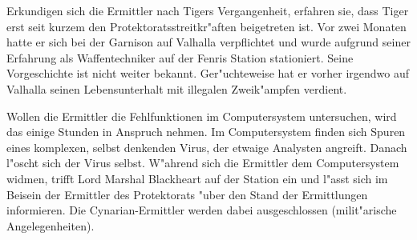 Erkundigen sich die Ermittler nach Tigers Vergangenheit, erfahren sie, dass Tiger erst seit kurzem den Protektoratsstreitkr"aften beigetreten ist. Vor zwei Monaten hatte er sich bei der Garnison auf Valhalla verpflichtet und wurde aufgrund seiner Erfahrung als Waffentechniker auf der Fenris Station stationiert. Seine Vorgeschichte ist nicht weiter bekannt. Ger"uchteweise hat er vorher irgendwo auf Valhalla seinen Lebensunterhalt mit illegalen Zweik"ampfen verdient. 

Wollen die Ermittler die Fehlfunktionen im Computersystem untersuchen, wird das einige Stunden in Anspruch nehmen. Im Computersystem finden sich Spuren eines komplexen, selbst denkenden Virus, der etwaige Analysten angreift. Danach l"oscht sich der Virus selbst. W"ahrend sich die Ermittler dem Computersystem widmen, trifft Lord Marshal Blackheart auf der Station ein und l"asst sich im Beisein der Ermittler des Protektorats "uber den Stand der Ermittlungen informieren. Die Cynarian-Ermittler werden dabei ausgeschlossen (milit"arische Angelegenheiten).

